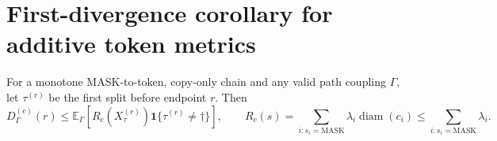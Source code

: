 \section*{First-divergence corollary for additive token metrics}
For a monotone MASK-to-token, copy-only chain and any valid path coupling
$\Gamma$, let $\tau^{(r)}$ be the first split before endpoint $r$. Then
\[
D_\Gamma^{(c)}(r)\leq \mathbb E_\Gamma\!\left[R_c(X_{\tau}^{(r)})
\mathbf 1\{\tau^{(r)}\neq\dagger\}\right],\qquad
R_c(s)=\sum_{i:s_i=\mathrm{MASK}}\lambda_i\operatorname{diam}(c_i)
\leq\sum_{i:s_i=\mathrm{MASK}}\lambda_i.
\]

